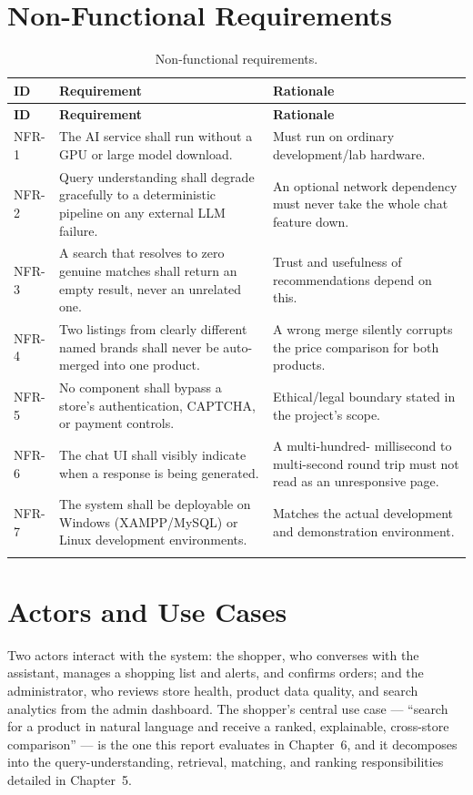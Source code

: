 \documentclass[12pt,a4paper]{report}
\begin{document}
\section{Non-Functional Requirements}
\begin{longtable}{p{1.4cm}p{5.5cm}p{5.6cm}}
\toprule
\textbf{ID} & \textbf{Requirement} & \textbf{Rationale} \\
\midrule
\endfirsthead
\toprule
\textbf{ID} & \textbf{Requirement} & \textbf{Rationale} \\
\midrule
\endhead
NFR-1 & The AI service shall run without a GPU or large model download. & Must run on ordinary
development/lab hardware. \\
NFR-2 & Query understanding shall degrade gracefully to a deterministic pipeline on any external LLM
failure. & An optional network dependency must never take the whole chat feature down. \\
NFR-3 & A search that resolves to zero genuine matches shall return an empty result, never an unrelated
one. & Trust and usefulness of recommendations depend on this. \\
NFR-4 & Two listings from clearly different named brands shall never be auto-merged into one product. &
A wrong merge silently corrupts the price comparison for both products. \\
NFR-5 & No component shall bypass a store's authentication, CAPTCHA, or payment controls. & Ethical/legal
boundary stated in the project's scope. \\
NFR-6 & The chat UI shall visibly indicate when a response is being generated. & A multi-hundred-
millisecond to multi-second round trip must not read as an unresponsive page. \\
NFR-7 & The system shall be deployable on Windows (XAMPP/MySQL) or Linux development environments. &
Matches the actual development and demonstration environment. \\
\bottomrule
\caption{Non-functional requirements.}
\end{longtable}

\section{Actors and Use Cases}
Two actors interact with the system: the shopper, who converses with the assistant, manages a shopping
list and alerts, and confirms orders; and the administrator, who reviews store health, product data
quality, and search analytics from the admin dashboard. The shopper's central use case --- ``search for a
product in natural language and receive a ranked, explainable, cross-store comparison'' --- is the one
this report evaluates in Chapter~6, and it decomposes into the query-understanding, retrieval, matching,
and ranking responsibilities detailed in Chapter~5.
\end{document}
